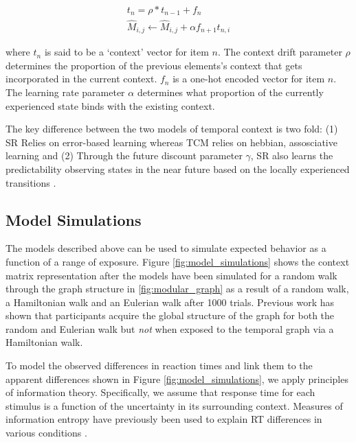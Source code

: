 \begin{equation}
	\begin{aligned}
		t_n = \rho * t_{n-1} + f_n \\ 
		\hat{M}_{i, j} \leftarrow \hat{M}_{i, j} + \alpha f_{n+1} t_{n, i}			
	\end{aligned}
\end{equation}

where $t_n$ is said to be a `context' vector for item $n$. The context drift parameter $\rho$ determines the proportion of the previous elements's context that gets incorporated in the current context. $f_n$ is a one-hot encoded vector for item $n$. The learning rate parameter $\alpha$ determines what proportion of the currently experienced state binds with the existing context. 

The key difference between the two models of temporal context is two fold: (1) SR Relies on error-based learning whereas TCM relies on hebbian, assosciative learning and (2) Through the future discount parameter $\gamma$, SR also learns the predictability observing states in the near future based on the locally experienced transitions \cite{gershman2012successor}.

\subsection{Model Simulations}
The models described above can be used to simulate expected behavior as a function of a range of exposure. Figure \ref{fig:model_simulations} shows the context matrix representation after the models have been simulated for a random walk through the graph structure in \ref{fig:modular_graph} as a result of a random walk, a Hamiltonian walk and an Eulerian walk after 1000 trials. Previous work has shown that participants acquire the global structure of the graph for both the random and Eulerian walk but \textit{not} when exposed to the temporal graph via a Hamiltonian walk. 

To model the observed differences in reaction times and link them to the apparent differences shown in Figure \ref{fig:model_simulations}, we apply principles of information theory. Specifically, we assume that response time for each stimulus is a function of the uncertainty in its surrounding context. Measures of information entropy have previously been used to explain RT differences in various conditions \cite{lynn2020abstract, lynn2020human,lynn2020humans}. 





